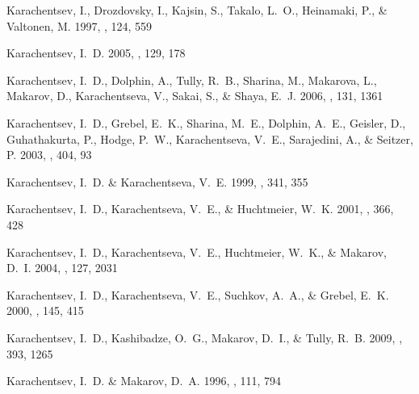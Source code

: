 \documentclass[manuscript]{aastex}
\begin{document}
\begin{thebibliography}{381}
{Karachentsev}, I., {Drozdovsky}, I., {Kajsin}, S., {Takalo}, L.~O.,
  {Heinamaki}, P., \& {Valtonen}, M. 1997, \aaps, 124, 559

{Karachentsev}, I.~D. 2005, \aj, 129, 178

{Karachentsev}, I.~D., {Dolphin}, A., {Tully}, R.~B., {Sharina}, M.,
  {Makarova}, L., {Makarov}, D., {Karachentseva}, V., {Sakai}, S., \& {Shaya},
  E.~J. 2006, \aj, 131, 1361

{Karachentsev}, I.~D., {Grebel}, E.~K., {Sharina}, M.~E., {Dolphin}, A.~E.,
  {Geisler}, D., {Guhathakurta}, P., {Hodge}, P.~W., {Karachentseva}, V.~E.,
  {Sarajedini}, A., \& {Seitzer}, P. 2003{}, \aap, 404, 93

{Karachentsev}, I.~D. \& {Karachentseva}, V.~E. 1999, \aap, 341, 355

{Karachentsev}, I.~D., {Karachentseva}, V.~E., \& {Huchtmeier}, W.~K.
  2001{}, \aap, 366, 428

{Karachentsev}, I.~D., {Karachentseva}, V.~E., {Huchtmeier}, W.~K., \&
  {Makarov}, D.~I. 2004, \aj, 127, 2031

{Karachentsev}, I.~D., {Karachentseva}, V.~E., {Suchkov}, A.~A., \& {Grebel},
  E.~K. 2000, \aaps, 145, 415

{Karachentsev}, I.~D., {Kashibadze}, O.~G., {Makarov}, D.~I., \& {Tully}, R.~B.
  2009, \mnras, 393, 1265

{Karachentsev}, I.~D. \& {Makarov}, D.~A. 1996, \aj, 111, 794


\end{thebibliography}
\end{document}
